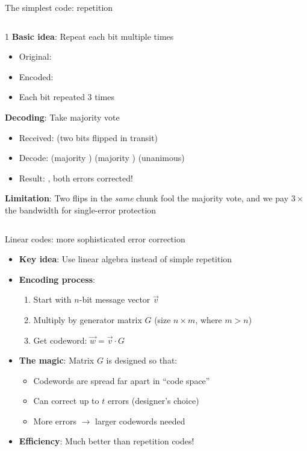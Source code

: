 \ifdefined\PRESENTATION\else\PassOptionsToClass{handout}{beamer}\fi\documentclass[aspectratio=169, lualatex]{beamer}
\begin{document}
\begin{frame}{The simplest code: repetition}
	\begin{columns}[c]
		\begin{column}{1\textwidth}
			\textbf{Basic idea}: Repeat each bit multiple times
			\begin{itemize}
				\item Original: 
				\item Encoded: 
				\item Each bit repeated 3 times
			\end{itemize}

			\textbf{Decoding}: Take majority vote
			\begin{itemize}
				\item Received:  (two bits flipped in transit)
				\item Decode: \bit{0} (majority ) \bit{1} (majority )  (unanimous)
				\item Result: , both errors corrected!
			\end{itemize}

			\textbf{Limitation}: Two flips in the \textit{same} chunk fool the majority vote, and we pay $3\times$ the bandwidth for single-error protection
		\end{column}
	\end{columns}
\end{frame}

\begin{frame}{Linear codes: more sophisticated error correction}
	\begin{itemize}
		\item \textbf{Key idea}: Use linear algebra instead of simple repetition
		\item \textbf{Encoding process}:
		      \begin{enumerate}
			      \item Start with $n$-bit message vector $\vec{v}$
			      \item Multiply by generator matrix $G$ (size $n \times m$, where $m > n$)
			      \item Get codeword: $\vec{w} = \vec{v} \cdot G$
		      \end{enumerate}
		\item \textbf{The magic}: Matrix $G$ is designed so that:
		      \begin{itemize}
			      \item Codewords are spread far apart in ``code space''
			      \item Can correct up to $t$ errors (designer's choice)
			      \item More errors $\rightarrow$ larger codewords needed
		      \end{itemize}
		\item \textbf{Efficiency}: Much better than repetition codes!
	\end{itemize}
\end{frame}
\end{document}
